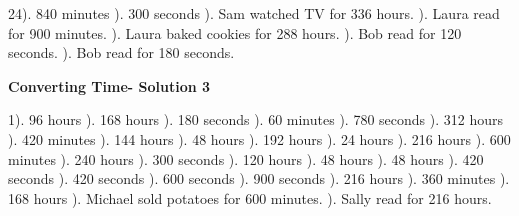 \documentclass{article}%
\begin{document}
24). 840 minutes%
). 300 seconds%
). Sam watched TV for 336 hours.%
). Laura read for 900 minutes.%
). Laura baked cookies for 288 hours.%
). Bob read for 120 seconds.%
). Bob read for 180 seconds.%
\newline%
\newpage%
\large%
\begin{center}%
\textbf{Converting Time- Solution 3}%
\newline%
\end{center} \normalsize%
1). 96 hours%
). 168 hours%
). 180 seconds%
). 60 minutes%
). 780 seconds%
). 312 hours%
). 420 minutes%
). 144 hours%
). 48 hours%
). 192 hours%
). 24 hours%
). 216 hours%
). 600 minutes%
). 240 hours%
). 300 seconds%
). 120 hours%
). 48 hours%
). 48 hours%
). 420 seconds%
). 420 seconds%
). 600 seconds%
). 900 seconds%
). 216 hours%
). 360 minutes%
). 168 hours%
). Michael sold potatoes for 600 minutes.%
). Sally read for 216 hours.%
\newline%
\end{document}
